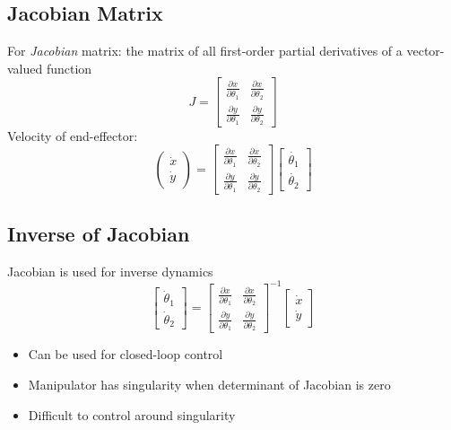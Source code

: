 \documentclass[10pt]{article}
\begin{document}
\subsection*{Jacobian Matrix}
For \textit{Jacobian} matrix: the matrix of all first-order partial derivatives of a vector-valued function
\[J = \begin{bmatrix} \frac{\partial x}{\partial \theta_1} & \frac{\partial x}{\partial \theta_2} \\ \frac{\partial y}{\partial \theta_1} & \frac{\partial y}{\partial \theta_2} \end{bmatrix}\]
Velocity of end-effector:
\[\begin{pmatrix} \dot{x} \\ \dot{y} \end{pmatrix} = \begin{bmatrix} \frac{\partial x}{\partial \theta_1} & \frac{\partial x}{\partial \theta_2} \\ \frac{\partial y}{\partial \theta_1} & \frac{\partial y}{\partial \theta_2} \end{bmatrix} \begin{bmatrix} \dot{\theta_1} \\ \dot{\theta_2} \end{bmatrix}\]

\subsection*{Inverse of Jacobian}
Jacobian is used for inverse dynamics
\[\begin{bmatrix} \dot{\theta}_1 \\ \dot{\theta}_2 \end{bmatrix} = \begin{bmatrix} \frac{\partial x}{\partial \theta_1} & \frac{\partial x}{\partial \theta_2} \\ \frac{\partial y}{\partial \theta_1} & \frac{\partial y}{\partial \theta_2} \end{bmatrix}^{-1} \begin{bmatrix} \dot{x} \\ \dot{y} \end{bmatrix}\]
\begin{itemize}
	\item Can be used for closed-loop control
	\item Manipulator has singularity when determinant of Jacobian is zero
	\item Difficult to control around singularity
\end{itemize}
\end{document}
